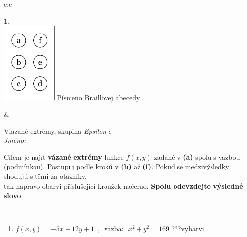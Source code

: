 \documentclass[10pt]{report}
\begin{document}
\begin{tabular}{c:c}
\begin{minipage}[c][104.5mm][t]{0.5\linewidth}
\begin{center}
\begin{minipage}{0.79\linewidth}
\begin{center}
\begin{varwidth}{\linewidth}
\begin{enumerate}
\end{enumerate}
\end{varwidth}
\end{center}
\end{minipage}
\begin{minipage}{0.20\linewidth}
\begin{center}
{\Huge\bfseries 1.} \\[2mm]
\includegraphics[height=40mm]{../images/braille.png}
{\small Písmeno Braillovej abecedy}
\end{center}
\end{minipage}
\end{center}
\end{minipage}
&
\begin{minipage}[c][104.5mm][t]{0.5\linewidth}
\begin{center}
\vspace{7mm}
{\huge Viazané extrémy, skupina \textit{Epsilon $\epsilon$} -}\\[5mm]
\textit{Jméno:}\phantom{xxxxxxxxxxxxxxxxxxxxxxxxxxxxxxxxxxxxxxxxxxxxxxxxxxxxxxxxxxxxxxxxx}\\[5mm]
\begin{minipage}{0.95\linewidth}
\begin{center}
Cílem je najít \textbf{vázané extrémy} funkce $f(x,y)$ zadané v \textbf{(a)} spolu s vazbou (podmínkou). Postupuj podle krokú v \textbf{(b)} až \textbf{(f)}. Pokud se medzivýsledky shodujú s těmi za otazníky,\\tak napravo obarvi příslušející kroužek načerno. \textbf{Spolu odevzdejte výsledné slovo}.
\end{center}
\end{minipage}
\\[1mm]
\begin{minipage}{0.79\linewidth}
\begin{center}
\begin{varwidth}{\linewidth}
\begin{enumerate}
\normalsize
\item $f(x,y)=-5x-12y+1 \enspace , \enspace \mathrm{vazba:} \enspace x^2+y^2=169$\quad \dotfill\; ???\;\dotfill \quad vybarvi

\end{enumerate}
\end{varwidth}
\end{center}
\end{minipage}
\end{center}
\end{minipage}
\end{tabular}
\end{document}
